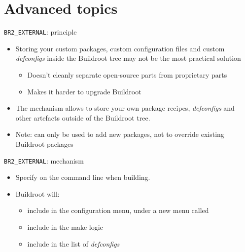\section{Advanced topics}

\begin{frame}{{\tt BR2\_EXTERNAL}: principle}
  \begin{itemize}
  \item Storing your custom packages, custom configuration files and
    custom {\em defconfigs} inside the Buildroot tree may not be the
    most practical solution
    \begin{itemize}
    \item Doesn't cleanly separate open-source parts from proprietary parts
    \item Makes it harder to upgrade Buildroot
    \end{itemize}
  \item The  mechanism allows to store your own
    package recipes, {\em defconfigs} and other artefacts outside of
    the Buildroot tree.
  \item Note: can only be used to add new packages, not to override
    existing Buildroot packages
  \end{itemize}
\end{frame}

\begin{frame}{{\tt BR2\_EXTERNAL}: mechanism}
  \begin{itemize}
  \item Specify  on the command line when building.
  \item Buildroot will:
    \begin{itemize}
    \item include  in the
      configuration menu, under a new menu called 
    \item include  in the make logic
    \item include  in the list of {\em defconfigs}
    \end{itemize}
  \end{itemize}
\end{frame}

